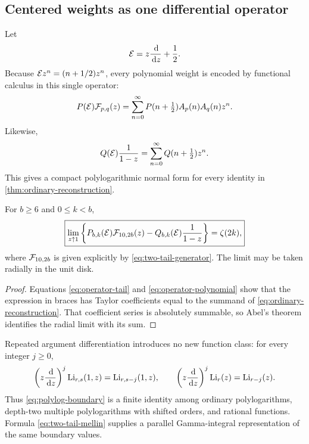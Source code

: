 \subsection{Centered weights as one differential operator}

Let
\begin{equation}
 \mathcal{E}=z\frac{\,\mathrm{d}}{\,\mathrm{d} z}+\frac12.
 \label{eq:centered-Euler}
\end{equation}
Because $\mathcal{E} z^n=(n+1/2)z^n$, every polynomial weight is encoded by
functional calculus in this single operator:
\begin{equation}
 P(\mathcal{E})\mathcal{F}_{p,q}(z)
 =\sum_{n=0}^{\infty}P(n+\tfrac12)A_p(n)A_q(n)z^n.
 \label{eq:operator-tail}
\end{equation}
Likewise,
\begin{equation}
 Q(\mathcal{E})\frac1{1-z}
 =\sum_{n=0}^{\infty}Q(n+\tfrac12)z^n.
 \label{eq:operator-polynomial}
\end{equation}
This gives a compact polylogarithmic normal form for every identity in
\cref{thm:ordinary-reconstruction}.

\begin{corollary}
\label{cor:polylog-boundary}
For $b\ge6$ and $0\le k<b$,
\begin{equation}
 \boxed{\displaystyle
 \lim_{z\uparrow1}
 \left\{
 P_{b,k}(\mathcal{E})\mathcal{F}_{10,2b}(z)
 -Q_{b,k}(\mathcal{E})\frac1{1-z}
 \right\}=\zeta(2k),}
 \label{eq:polylog-boundary}
\end{equation}
where $\mathcal{F}_{10,2b}$ is given explicitly by
\eqref{eq:two-tail-generator}.  The limit may be taken radially in the
unit disk.
\end{corollary}

\begin{proof}
Equations \eqref{eq:operator-tail} and
\eqref{eq:operator-polynomial} show that the expression in braces has
Taylor coefficients equal to the summand of
\eqref{eq:ordinary-reconstruction}.  That coefficient series is
absolutely summable, so Abel's theorem identifies the radial limit with
its sum.
\end{proof}

Repeated argument differentiation introduces no new function class:
for every integer $j\ge0$,
\begin{equation}
 \left(z\frac{\,\mathrm{d}}{\,\mathrm{d} z}\right)^j\operatorname{Li}_{r,s}(1,z)
   =\operatorname{Li}_{r,s-j}(1,z),
 \qquad
 \left(z\frac{\,\mathrm{d}}{\,\mathrm{d} z}\right)^j\operatorname{Li}_r(z)=\operatorname{Li}_{r-j}(z).
 \label{eq:order-lowering}
\end{equation}
Thus \eqref{eq:polylog-boundary} is a finite identity among ordinary
polylogarithms, depth-two multiple polylogarithms with shifted orders,
and rational functions.  Formula \eqref{eq:two-tail-mellin} supplies a
parallel Gamma-integral representation of the same boundary values.

